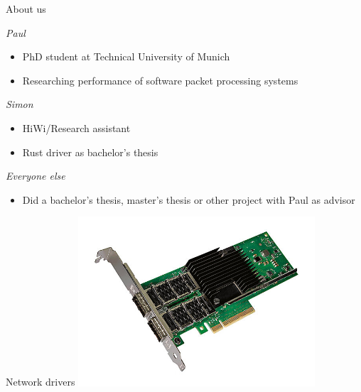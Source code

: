 \documentclass[NET,english,aspectratio=169,notitleframe]{tumbeamer}
\begin{document}
\begin{frame}{About us}
\emph{Paul}
\begin{itemize}
\item PhD student at Technical University of Munich
\item Researching performance of software packet processing systems
\end{itemize}
\vfill
\emph{Simon}
\begin{itemize}
\item HiWi/Research assistant
\item Rust driver as bachelor's thesis
\end{itemize}
\emph{Everyone else}
\begin{itemize}
\item Did a bachelor's thesis, master's thesis or other project with Paul as advisor
\end{itemize}
\end{frame}


\begin{frame}{Network drivers}
\centering\includegraphics[width=0.66\textwidth]{pics/nic3}
\end{frame}
\end{document}
